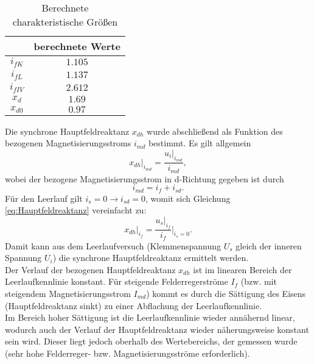 \begin{table}[!ht]
\centering
\begin{tabular}{|c|c|}
\hline
            & berechnete Werte  \\ \hline
$i_{fK}$    &  $1.105$          \\ \hline
$i_{fL}$    & $1.137$           \\ \hline
$i_{fIV}$   & $2.612$           \\ \hline
$x_d$       & $1.69$            \\ \hline
$x_{d0}$   & $0.97$            \\ \hline
\end{tabular}
\caption{Berechnete charakteristische Größen}
\label{tab:Fischer_Hinnen_berechnete_Werte}
\end{table}
\noindent Die synchrone Hauptfeldreaktanz $x_{dh}$ wurde abschließend als Funktion des bezogenen Magnetisierungsstroms $i_{md}$ bestimmt. Es gilt allgemein
\begin{equation*}
    \label{eq:Hauptfeldreaktanz}
    x_{dh} \big|_{i_{md}} = \frac{u_{i} \big|_{i_{md}}}{i_{md}},
\end{equation*}
wobei der bezogene Magnetisierungsstrom in d-Richtung gegeben ist durch 
\begin{equation*}
    i_{md} = i_f + i_{sd}.
\end{equation*}
Für den Leerlauf gilt $i_s = 0 \rightarrow i_{sd} = 0$, womit sich Gleichung \ref{eq:Hauptfeldreaktanz} vereinfacht zu:
\begin{equation*}
        x_{dh} \big|_{i_{f}} = \frac{u_{s} \big|_{i_{f}}}{i_{f}} \big|_{i_s=0}.
\end{equation*}
Damit kann aus dem Leerlaufversuch (Klemmenspannung $U_s$ gleich der inneren Spannung $U_i$) die synchrone Hauptfeldreaktanz ermittelt werden.\\
Der Verlauf der bezogenen Hauptfeldreaktanz $x_{dh}$ ist im linearen Bereich der Leerlaufkennlinie konstant. Für steigende Felderregerströme $I_f$ (bzw. mit steigendem Magnetisierungsstrom $I_{md}$) kommt es durch die Sättigung des Eisens (Hauptfeldreaktanz sinkt) zu einer Abflachung der Leerlaufkennlinie.\\
Im Bereich hoher Sättigung ist die Leerlaufkennlinie wieder annähernd linear, wodurch auch der Verlauf der Hauptfeldreaktanz wieder näherungsweise konstant sein wird. Dieser liegt jedoch oberhalb des Wertebereichs, der gemessen wurde (sehr hohe Felderreger- bzw. Magnetisierungsströme erforderlich). 


